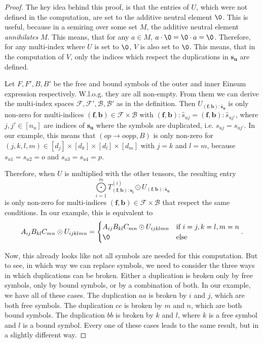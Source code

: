 \bigskip
\begin{proof}
    \small
    The key idea behind this proof, is that the entries of $U$, which were not defined in the computation, are set to the additive neutral element $\0$.
    This is useful, because in a semiring over some set $M$, the additive neutral element \textit{annihilates} $M$.
    This means, that for any $a \in M$, $a \cdot \0 = \0 \cdot a = \0$.
    Therefore, for any multi-index where $U$ is set to $\0$, $V$ is also set to $\0$.
    This means, that in the computation of $V$, only the indices which respect the duplications in $\bm{s_u}$ are defined.

    Let $F, F', B, B'$ be the free and bound symbols of the outer and inner Einsum expression respectively.
    W.l.o.g. they are all non-empty.
    From them we can derive the multi-index spaces $\mathcal{F}, \mathcal{F}', \mathcal{B}, \mathcal{B}'$ as in the definition.
    Then $U_{(\bm{f}, \bm{b}): \bm{\hat{s}_u}}$ is only non-zero for multi-indices $(\bm{f}, \bm{b}) \in \mathcal{F} \times \mathcal{B}$ with $(\bm{f}, \bm{b}):\hat{s}_{uj} = (\bm{f}, \bm{b}):\hat{s}_{uj'}$, where $j,j' \in [n_u]$ are indices of $\bm{s_u}$ where the symbols are duplicated, i.e. $s_{uj} = s_{uj'}$.
    In our example, this means that $(op \rightarrow oopp, B)$ is only non-zero for $(j,k,l,m) \in [d_j] \times [d_k] \times [d_l] \times [d_m]$ with $j = k$ and $l = m$, because $s_{u1} = s_{u2} = o$ and $s_{u3} = s_{u4} = p$.

    Therefore, when $U$ is multiplied with the other tensors, the resulting entry
    $$\bigodot\limits_{i = 1}^{m} T^{(i)}_{(\bm{f}, \bm{b}): \bm{s_i}} \odot U_{(\bm{f}, \bm{b}): \bm{\hat{s}_u}}$$
    is only non-zero for multi-indices $(\bm{f}, \bm{b}) \in \mathcal{F} \times \mathcal{B}$ that respect the same conditions.
    In our example, this is equivalent to
    $$A_{ij} B_{kl} C_{mn} \odot U_{ijklmn} = \begin{cases}
            A_{ij} B_{kl} C_{mn} \odot U_{ijklmn} & \text{if } i = j, k = l, m = n \\
            \0                                    & \text{else}
        \end{cases}.$$

    Now, this already looks like not all symbols are needed for this computation.
    But to see, in which way we can replace symbols, we need to consider the three ways in which duplications can be broken.
    Either a duplication is broken only by free symbols, only by bound symbols, or by a combination of both.
    In our example, we have all of these cases.
    The duplication $aa$ is broken by $i$ and $j$, which are both free symbols.
    The duplication $cc$ is broken by $m$ and $n$, which are both bound symbols.
    The duplication $bb$ is broken by $k$ and $l$, where $k$ is a free symbol and $l$ is a bound symbol.
    Every one of these cases leads to the same result, but in a slightly different way.


\end{proof}
